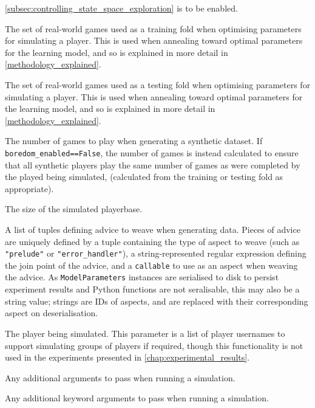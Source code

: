 \begin{description}[style=multiline,leftmargin=3cm]
  \cref{subsec:controlling_state_space_exploration} is to be enabled.
  \item[training\\data] The set of real-world games used as a training fold when
  optimising parameters for simulating a player. This is used when annealing
  toward optimal parameters for the learning model, and so is explained in more
  detail in \cref{methodology_explained}.
  \item[testing\\data] The set of real-world games used as a testing fold when
  optimising parameters for simulating a player. This is used when annealing
  toward optimal parameters for the learning model, and so is explained in more
  detail in \cref{methodology_explained}.
  \item[iteration\\base] The number of games to play when generating a synthetic
  dataset. If \lstinline{boredom_enabled==False}, the number of games is instead
  calculated to ensure that all synthetic players play the same number of games
  as were completed by the played being simulated, (calculated from the training
  or testing fold as appropriate).
  \item[number\\simulated\\players] The size of the simulated playerbase.
  \item[advice] A list of tuples defining advice to weave when generating data.
  Pieces of advice are uniquely defined by a tuple containing the type of aspect
  to weave (such as \lstinline{"prelude"} or \lstinline{"error_handler"}), a
  string-represented regular expression defining the join point of the advice,
  and a \lstinline{callable} to use as an aspect when weaving the advice. As
  \lstinline{ModelParameters} instances are serialised to disk to persist
  experiment results and Python functions are not seralisable, this may also be
  a string value; strings are IDs of aspects, and are replaced with their
  corresponding aspect on deserialisation.
  \item[players] The player being simulated. This parameter is a list of player
  usernames to support simulating groups of players if required, though this
  functionality is not used in the experiments presented in
  \cref{chap:experimental_results}.
  \item[args] Any additional arguments to pass when running a simulation.
  \item[kwargs] Any additional keyword arguments to pass when running a simulation.

\end{description}
